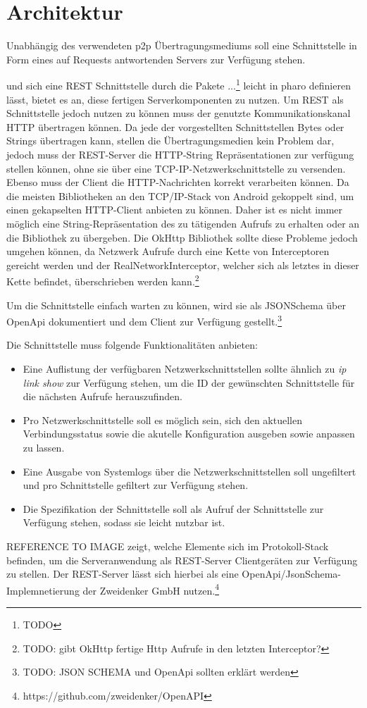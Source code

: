 \section{Architektur}
    Unabhängig des verwendeten p2p Übertragungsmediums soll eine Schnittstelle in Form eines auf Requests antwortenden Servers zur Verfügung stehen.

    und sich eine REST Schnittstelle durch die Pakete ...\footnote{TODO} leicht in pharo definieren lässt, bietet es an, diese fertigen Serverkomponenten zu nutzen.
    Um REST als Schnittstelle jedoch nutzen zu können muss der genutzte Kommunikationskanal HTTP übertragen können. Da jede der vorgestellten Schnittstellen Bytes oder Strings
    übertragen kann, stellen die Übertragungsmedien kein Problem dar, jedoch muss der REST-Server die HTTP-String Repräsentationen zur verfügung stellen können,
    ohne sie über eine TCP-IP-Netzwerkschnittstelle zu versenden. Ebenso muss der Client die HTTP-Nachrichten korrekt verarbeiten können.
    Da die meisten Bibliotheken an den TCP/IP-Stack von Android gekoppelt sind, um einen gekapselten HTTP-Client anbieten zu können.
    Daher ist es nicht immer möglich eine String-Repräsentation des zu tätigenden Aufrufs zu erhalten oder an die Bibliothek zu übergeben.
    Die OkHttp Bibliothek sollte diese Probleme jedoch umgehen können, da Netzwerk Aufrufe durch eine Kette von Interceptoren gereicht werden und der RealNetworkInterceptor,
    welcher sich als letztes in dieser Kette befindet, überschrieben werden kann.\footnote{TODO: gibt OkHttp fertige Http Aufrufe in den letzten Interceptor?}

    Um die Schnittstelle einfach warten zu können, wird sie als JSONSchema über OpenApi dokumentiert und dem Client zur Verfügung gestellt.\footnote{TODO: JSON SCHEMA und OpenApi sollten erklärt werden}

    Die Schnittstelle muss folgende Funktionalitäten anbieten:
    \begin{itemize}
        \item Eine Auflistung der verfügbaren Netzwerkschnittstellen sollte ähnlich zu {\it ip link show} zur Verfügung stehen, um die ID der gewünschten Schnittstelle für die nächsten Aufrufe herauszufinden.
        \item Pro Netzwerkschnittstelle soll es möglich sein, sich den aktuellen Verbindungsstatus sowie die akutelle Konfiguration ausgeben sowie anpassen zu lassen.
        \item Eine Ausgabe von Systemlogs über die Netzwerkschnittstellen soll ungefiltert und pro Schnittstelle gefiltert zur Verfügung stehen.
        \item Die Spezifikation der Schnittstelle soll als Aufruf der Schnittstelle zur Verfügung stehen, sodass sie leicht nutzbar ist.
    \end{itemize}

    REFERENCE TO IMAGE zeigt, welche Elemente sich im Protokoll-Stack befinden, um die Serveranwendung als REST-Server Clientgeräten zur Verfügung zu stellen.
    Der REST-Server lässt sich hierbei als eine OpenApi/JsonSchema-Implemnetierung der Zweidenker GmbH nutzen.\footnote{https://github.com/zweidenker/OpenAPI}
